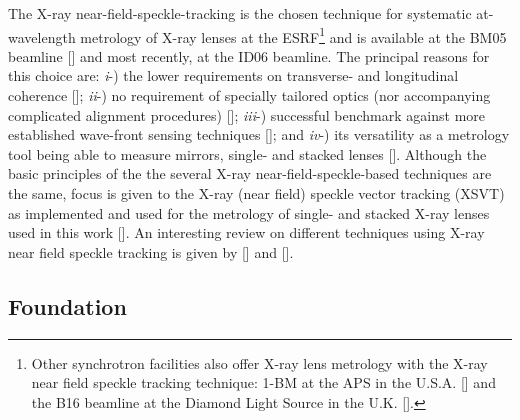 \begin{refsection}
The X-ray near-field-speckle-tracking is the chosen technique for systematic at-wavelength metrology of X-ray lenses at the ESRF\footnote{Other synchrotron facilities also offer X-ray lens metrology with the X-ray near field speckle tracking technique: 1-BM at the APS in the U.S.A. [\cite{Qiao2020}] and the B16 beamline at the Diamond Light Source in the U.K. [\cite{Sawhney2013}].} and is available at the BM05 beamline [\cite{Berujon2020a}] and most recently, at the ID06 beamline. The principal reasons for this choice are: \textit{i}-) the lower requirements on transverse- and longitudinal coherence [\cite{Zanette2014,Zdora2015,Wang2016}]; \textit{ii}-) no requirement of specially tailored optics (nor accompanying complicated alignment procedures) [\cite{Morgan2012,Wang2016}]; \textit{iii}-) successful benchmark against more established wave-front sensing techniques [\cite{Kashyap2016,Romell2017}]; and \textit{iv}-) its versatility as a metrology tool being able to measure mirrors, single- and stacked lenses [\cite{Berujon2020a}]. Although the basic principles of the the several X-ray near-field-speckle-based techniques are the same, focus is given to the X-ray (near field) speckle vector tracking (XSVT) as implemented and used for the metrology of single- and stacked X-ray lenses used in this work [\cite{Berujon2020a,Berujon2020}]. An interesting review on different techniques using X-ray near field speckle tracking is given by [\cite{Zdora2018a}] and [\cite{Berujon2020}].

\subsection{Foundation}\label{sec:foundation}


\end{refsection}
